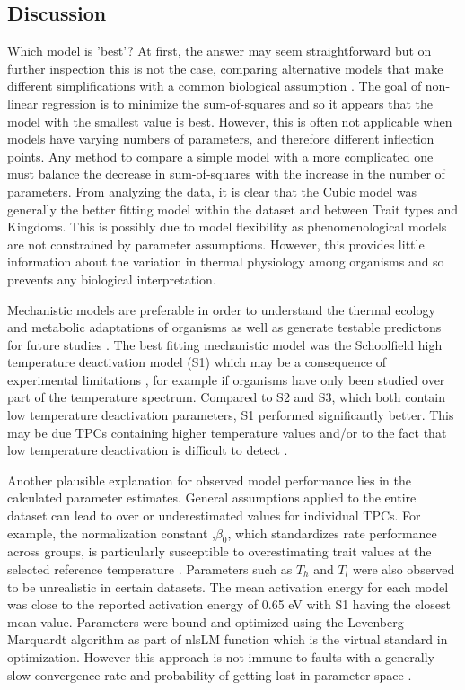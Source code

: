 \documentclass[12pt]{article}
\begin{document}
\begin{linenumbers}
\section{Discussion}

Which model is 'best'? At first, the answer may seem straightforward but on further inspection this is not the case, comparing alternative models that make different simplifications with a common biological assumption \cite{article}. The goal of non-linear regression is to minimize the sum-of-squares and so it appears that the model with the smallest value is best. However, this is often not applicable when  models have varying numbers of parameters, and therefore different inflection points. Any method to compare a simple model with a more complicated one must balance the decrease in sum-of-squares with the increase in the number of parameters. From analyzing the data, it is clear that the Cubic model was generally the better fitting model within the dataset and between Trait types and Kingdoms. This is possibly due to model flexibility as phenomenological models are not constrained by parameter assumptions. However, this provides little information about the variation in thermal physiology among organisms and so prevents any biological interpretation. 

Mechanistic models are preferable in order to understand the thermal ecology and metabolic adaptations of organisms as well as generate testable predictons for future studies
\cite{article4}\cite{Schulte2015TheEO} \cite{Martin2017PhenomenologicalVB} \cite{delong2017combined}. The best fitting mechanistic model was the Schoolfield high temperature deactivation model (S1) which may be a consequence of experimental limitations \cite{schoolfield1981non}, for example if organisms have only been studied over part of the temperature spectrum. Compared to S2 and S3, which both contain low temperature deactivation parameters, S1 performed significantly better. This may be due TPCs containing higher temperature values and/or to the fact that low temperature deactivation is difficult to detect \cite{pawar2016real}.

Another plausible explanation for observed model performance lies in the calculated parameter estimates. General assumptions applied to the entire dataset can lead to over or underestimated values for individual TPCs. For example, the normalization constant ,\(\beta_0\), which standardizes rate performance across groups, is particularly susceptible to overestimating trait values at the selected reference temperature \cite{kontopoulos2018use}. Parameters such as \(T_h\) and \(T_l\) were also observed to be unrealistic in certain datasets. The mean activation energy for each model was close to the reported activation energy of 0.65 eV with S1 having the closest mean value. Parameters were bound and optimized using the Levenberg-Marquardt algorithm as part of nlsLM function which is the virtual standard in optimization. However this approach is not immune to faults with a generally slow convergence rate and probability of getting lost in parameter space \cite{article14}.


\end{linenumbers}
\end{document}
